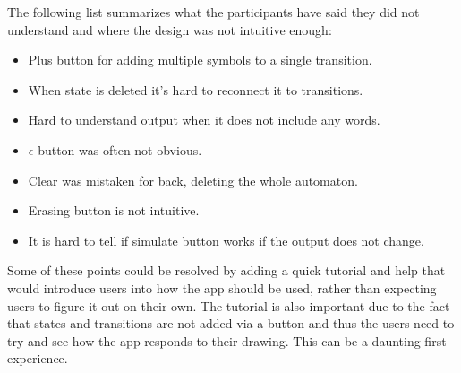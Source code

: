 The following list summarizes what the participants have said they did not understand and where the design was not intuitive enough:
\begin{itemize}
    \item Plus button for adding multiple symbols to a single transition.
    \item When state is deleted it's hard to reconnect it to transitions.
    \item Hard to understand output when it does not include any words.
    \item $\epsilon$ button was often not obvious.
    \item Clear was mistaken for back, deleting the whole automaton.
    \item Erasing button is not intuitive.
    \item It is hard to tell if simulate button works if the output does not change.
\end{itemize}
Some of these points could be resolved by adding a quick tutorial and help that would introduce users into how the app should be used, rather than expecting users to figure it out on their own. The tutorial is also important due to the fact that states and transitions are not added via a button and thus the users need to try and see how the app responds to their drawing. This can be a daunting first experience. 

